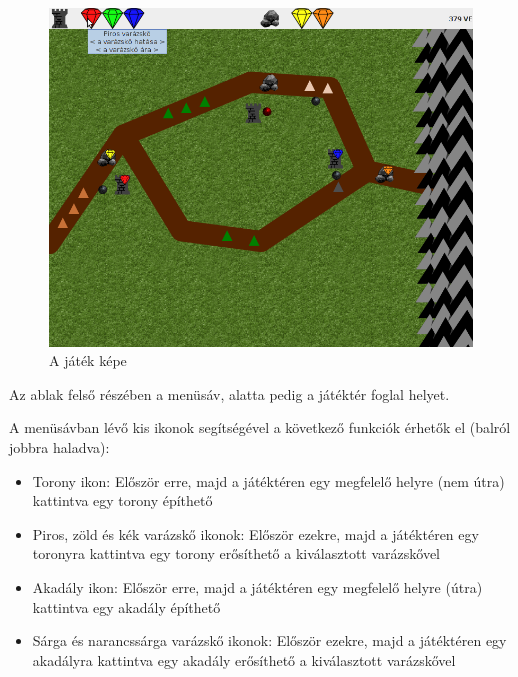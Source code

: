 \begin{figure}[H]
\begin{center}
\includegraphics[width=14cm]{images/ch11/screenshot_game.png}
\caption{A játék képe}
\label{fig:screenshot_game}
\end{center}
\end{figure}

Az ablak felső részében a menüsáv, alatta pedig a játéktér foglal helyet.

A menüsávban lévő kis ikonok segítségével a következő funkciók érhetők el (balról jobbra haladva):

\begin{itemize}
\item Torony ikon: Először erre, majd a játéktéren egy megfelelő helyre (nem útra) kattintva egy torony építhető
\item Piros, zöld és kék varázskő ikonok: Először ezekre, majd a játéktéren egy toronyra kattintva egy torony erősíthető a kiválasztott varázskővel
\item Akadály ikon: Először erre, majd a játéktéren egy megfelelő helyre (útra) kattintva egy akadály építhető
\item Sárga és narancssárga varázskő ikonok: Először ezekre, majd a játéktéren egy akadályra kattintva egy akadály erősíthető a kiválasztott varázskővel
\end{itemize}

